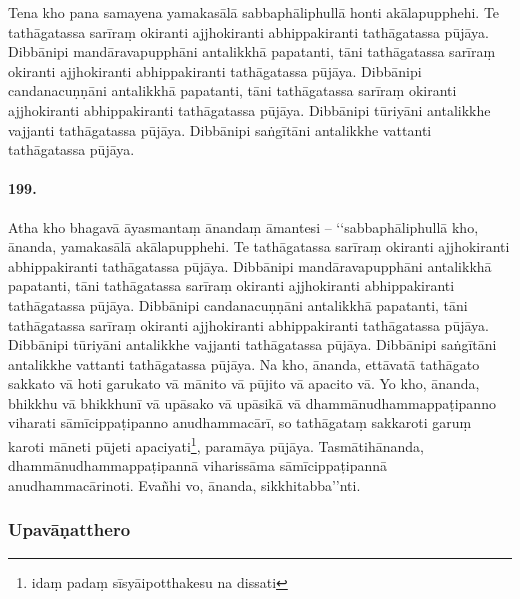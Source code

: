 Tena kho pana samayena yamakasālā sabbaphāliphullā honti akālapupphehi. Te tathāgatassa sarīraṃ okiranti ajjhokiranti abhippakiranti tathāgatassa pūjāya. Dibbānipi mandāravapupphāni antalikkhā papatanti, tāni tathāgatassa sarīraṃ okiranti ajjhokiranti abhippakiranti tathāgatassa pūjāya. Dibbānipi candanacuṇṇāni antalikkhā papatanti, tāni tathāgatassa sarīraṃ okiranti ajjhokiranti abhippakiranti tathāgatassa pūjāya. Dibbānipi tūriyāni antalikkhe vajjanti tathāgatassa pūjāya. Dibbānipi saṅgītāni antalikkhe vattanti tathāgatassa pūjāya.

\paragraph{199.} Atha kho bhagavā āyasmantaṃ ānandaṃ āmantesi – ‘‘sabbaphāliphullā kho, ānanda, yamakasālā akālapupphehi. Te tathāgatassa sarīraṃ okiranti ajjhokiranti abhippakiranti tathāgatassa pūjāya. Dibbānipi mandāravapupphāni antalikkhā papatanti, tāni tathāgatassa sarīraṃ okiranti ajjhokiranti abhippakiranti tathāgatassa pūjāya. Dibbānipi candanacuṇṇāni antalikkhā papatanti, tāni tathāgatassa sarīraṃ okiranti ajjhokiranti abhippakiranti tathāgatassa pūjāya. Dibbānipi tūriyāni antalikkhe vajjanti tathāgatassa pūjāya. Dibbānipi saṅgītāni antalikkhe vattanti tathāgatassa pūjāya. Na kho, ānanda, ettāvatā tathāgato sakkato vā hoti garukato vā mānito vā pūjito vā apacito vā. Yo kho, ānanda, bhikkhu vā bhikkhunī vā upāsako vā upāsikā vā dhammānudhammappaṭipanno viharati sāmīcippaṭipanno anudhammacārī, so tathāgataṃ sakkaroti garuṃ karoti māneti pūjeti apaciyati\footnote{idaṃ padaṃ sīsyāipotthakesu na dissati}, paramāya pūjāya. Tasmātihānanda, dhammānudhammappaṭipannā viharissāma sāmīcippaṭipannā anudhammacārinoti. Evañhi vo, ānanda, sikkhitabba’’nti.

\subsubsection{Upavāṇatthero}

